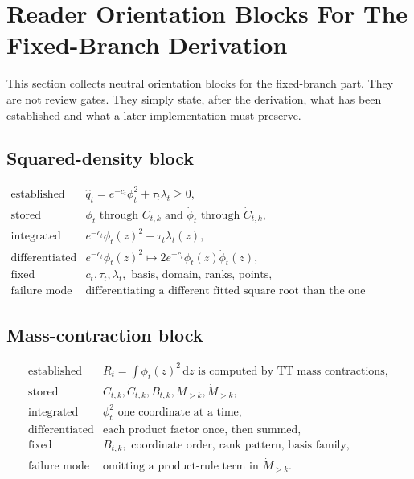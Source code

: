 \documentclass[11pt]{article}
\newcommand{\dd}{\,\mathrm d}
\begin{document}
\section{Reader Orientation Blocks For The Fixed-Branch Derivation}

This section collects neutral orientation blocks for the fixed-branch part.
They are not review gates.  They simply state, after the derivation, what has
been established and what a later implementation must preserve.

\subsection*{Squared-density block}

\[
\begin{array}{ll}
\text{established} &
    \widehat q_t=e^{-c_t}\phi_t^2+\tau_t\lambda_t\ge0,\\[1mm]
\text{stored} &
    \phi_t \text{ through } C_{t,k}
    \text{ and } \dot\phi_t \text{ through } \dot C_{t,k},\\[1mm]
\text{integrated} &
    e^{-c_t}\phi_t(z)^2+\tau_t\lambda_t(z),\\[1mm]
\text{differentiated} &
    e^{-c_t}\phi_t(z)^2
    \mapsto 2e^{-c_t}\phi_t(z)\dot\phi_t(z),\\[1mm]
\text{fixed} &
    c_t,\tau_t,\lambda_t,\text{ basis, domain, ranks, points},\\[1mm]
\text{failure mode} &
    \text{differentiating a different fitted square root than the one squared.}
\end{array}
\tag{P22-R1}
\]

\subsection*{Mass-contraction block}

\[
\begin{array}{ll}
\text{established} &
    R_t=\int\phi_t(z)^2\dd z
    \text{ is computed by TT mass contractions},\\[1mm]
\text{stored} &
    C_{t,k},\dot C_{t,k},B_{t,k},M_{>k},\dot M_{>k},\\[1mm]
\text{integrated} &
    \phi_t^2 \text{ one coordinate at a time},\\[1mm]
\text{differentiated} &
    \text{each product factor once, then summed},\\[1mm]
\text{fixed} &
    B_{t,k},\text{ coordinate order, rank pattern, basis family},\\[1mm]
\text{failure mode} &
    \text{omitting a product-rule term in } \dot M_{>k}.
\end{array}
\tag{P22-R2}
\]
\end{document}
